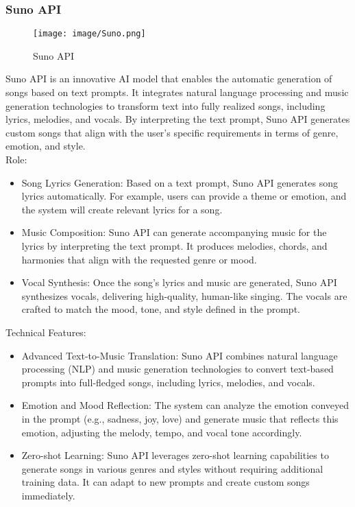 \documentclass[conference]{IEEEtran}
\begin{document}
\subsubsection{Suno API}

\begin{figure}[h!]
    \centering
    \texttt{[image: image/Suno.png]}
    \caption{Suno API}
    \label{fig:enter-label}
\end{figure}

\noindent Suno API is an innovative AI model that enables the automatic generation of songs based on text prompts. It integrates natural language processing and music generation technologies to transform text into fully realized songs, including lyrics, melodies, and vocals. By interpreting the text prompt, Suno API generates custom songs that align with the user’s specific requirements in terms of genre, emotion, and style.\\

Role:
\begin{itemize}
\item Song Lyrics Generation: Based on a text prompt, Suno API generates song lyrics automatically. For example, users can provide a theme or emotion, and the system will create relevant lyrics for a song.\\
\item Music Composition: Suno API can generate accompanying music for the lyrics by interpreting the text prompt. It produces melodies, chords, and harmonies that align with the requested genre or mood.\\
\item Vocal Synthesis: Once the song’s lyrics and music are generated, Suno API synthesizes vocals, delivering high-quality, human-like singing. The vocals are crafted to match the mood, tone, and style defined in the prompt.\\
\end{itemize}

Technical Features:
\begin{itemize}
    \item Advanced Text-to-Music Translation: Suno API combines natural language processing (NLP) and music generation technologies to convert text-based prompts into full-fledged songs, including lyrics, melodies, and vocals.\\
    \item Emotion and Mood Reflection: The system can analyze the emotion conveyed in the prompt (e.g., sadness, joy, love) and generate music that reflects this emotion, adjusting the melody, tempo, and vocal tone accordingly.\\
    \item Zero-shot Learning: Suno API leverages zero-shot learning capabilities to generate songs in various genres and styles without requiring additional training data. It can adapt to new prompts and create custom songs immediately.\\
\end{itemize}
\end{document}
